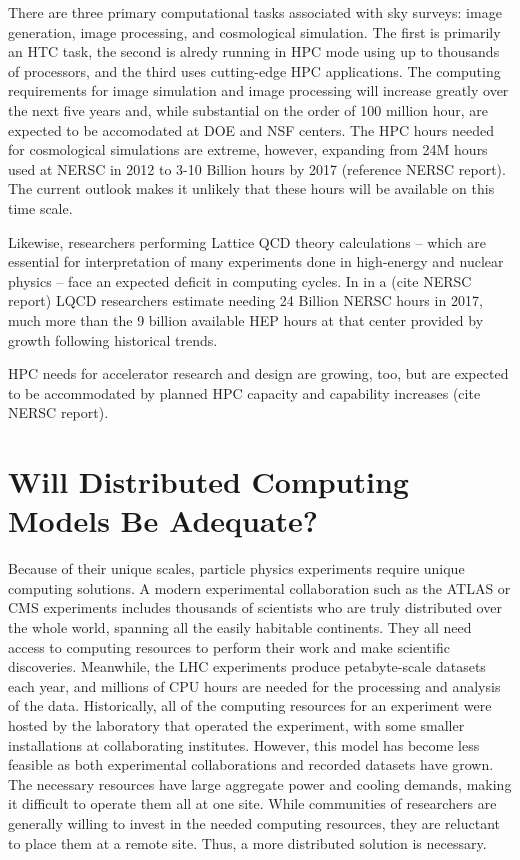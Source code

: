 There are three primary computational tasks associated with sky surveys: image generation, image processing, and cosmological simulation. The first 
is primarily an HTC task, the second is alredy running in HPC mode using up to thousands of processors, and the third uses cutting-edge HPC applications.  The computing requirements for image simulation and image processing will increase greatly over the next five years and, while substantial
on the order of 100 million hour, are expected to be accomodated at DOE and NSF centers. The HPC hours needed for cosmological simulations are extreme, however, expanding from 24M hours used at NERSC in 2012 to 3-10 Billion hours by 2017 (reference NERSC report). The current outlook
makes it unlikely that these hours will be available on this time scale. 
 
Likewise, researchers performing Lattice QCD theory calculations 
-- which are essential for interpretation of many experiments done in high-energy and nuclear physics -- 
face an expected deficit in computing cycles. In in a (cite NERSC report) LQCD researchers estimate needing 24 Billion NERSC hours
in 2017, much more than the 9 billion available HEP hours at that center provided by growth following historical trends.

HPC needs for accelerator research and design are growing, too, but are expected to be accommodated by planned HPC capacity and capability 
increases (cite NERSC report). 


\section{Will Distributed Computing Models Be Adequate?}
Because of their unique scales, particle physics experiments require unique computing solutions.  A modern experimental collaboration such as the ATLAS or CMS experiments includes thousands of scientists who are truly distributed over the whole world, spanning all the easily habitable continents.  They all need access to computing resources to perform their work and make scientific discoveries.  Meanwhile, the LHC experiments produce petabyte-scale datasets each year, and millions of CPU hours are needed for the processing and analysis of the data.  Historically, all of the computing resources for an experiment were hosted by the laboratory that operated the experiment, with some smaller installations at collaborating institutes.  However, this model has become less feasible as both experimental collaborations and recorded datasets have grown.  The necessary resources have large aggregate power and cooling demands, making it difficult to operate them all at one site.  While communities of researchers are generally willing to invest in the needed computing resources, they are reluctant to place them at a remote site.  Thus, a more distributed solution is necessary.

